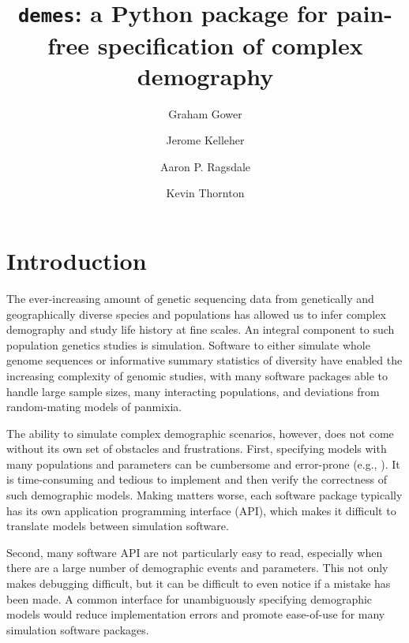 \documentclass[11pt]{article}
\newcommand{\demes}[0]{\texttt{demes}}
\begin{document}
\title{\demes: a Python package for pain-free specification of complex demography}
\author[1,*]{Graham Gower}
\author[2,*]{Jerome Kelleher}
\author[3,*]{Aaron P. Ragsdale}
\author[4,*]{Kevin Thornton}
\affil[1]{}
\affil[2]{}
\affil[3]{}
\affil[4]{}
\maketitle


\section*{Introduction}

The ever-increasing amount of genetic sequencing data from genetically and
geographically diverse species and populations has allowed us to infer complex
demography and study life history at fine scales. An integral component to such
population genetics studies is simulation. Software to either simulate whole
genome sequences
\citep{thornton2014c++,kelleher2016efficient,haller2019slim,adrion2020community}
or informative summary statistics of diversity
\citep{gutenkunst2009inferring,kamm2017efficient,jouganous2017inferring} have
enabled the increasing complexity of genomic studies, with many software
packages able to handle large sample sizes, many interacting populations, and
deviations from random-mating models of panmixia.

The ability to simulate complex demographic scenarios, however, does not come
without its own set of obstacles and frustrations. First, specifying models
with many populations and parameters can be cumbersome and error-prone (e.g.,
\citep{ragsdale2020lessons}). It is time-consuming and tedious to implement and
then verify the correctness of such demographic models. Making matters worse,
each software package typically has its own application programming interface
(API), which makes it difficult to translate models between simulation
software.

Second, many software API are not particularly easy to read, especially when
there are a large number of demographic events and parameters. This not only
makes debugging difficult, but it can be difficult to even notice if a mistake
has been made. A common interface for unambiguously specifying demographic
models would reduce implementation errors and promote ease-of-use for many
simulation software packages.
\end{document}
